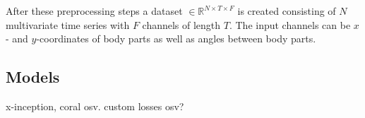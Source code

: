 After these preprocessing steps a dataset $\in \mathbb{R}^{N \times T \times F}$ is created consisting of $N$ multivariate time series with $F$ channels of length $T$. The input channels can be $x$- and $y$-coordinates of body parts as well as angles between body parts.

\subsection{Models}
x-inception, coral osv. custom losses osv?
